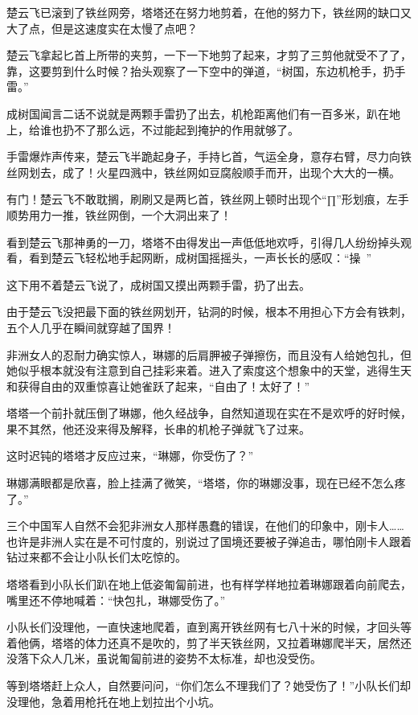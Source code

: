 楚云飞已滚到了铁丝网旁，塔塔还在努力地剪着，在他的努力下，铁丝网的缺口又大了点，但是这速度实在太慢了点吧？

楚云飞拿起匕首上所带的夹剪，一下一下地剪了起来，才剪了三剪他就受不了了，靠，这要剪到什么时候？抬头观察了一下空中的弹道，“树国，东边机枪手，扔手雷。”

成树国闻言二话不说就是两颗手雷扔了出去，机枪距离他们有一百多米，趴在地上，给谁也扔不了那么远，不过能起到掩护的作用就够了。

手雷爆炸声传来，楚云飞半跪起身子，手持匕首，气运全身，意存右臂，尽力向铁丝网划去，成了！火星四溅中，铁丝网如豆腐般顺手而开，出现个大大的一横。

有门！楚云飞不敢耽搁，刷刷又是两匕首，铁丝网上顿时出现个“∏”形划痕，左手顺势用力一推，铁丝网倒，一个大洞出来了！

看到楚云飞那神勇的一刀，塔塔不由得发出一声低低地欢呼，引得几人纷纷掉头观看，看到楚云飞轻松地手起网断，成树国摇摇头，一声长长的感叹：“操~”

这下用不着楚云飞说了，成树国又摸出两颗手雷，扔了出去。

由于楚云飞没把最下面的铁丝网划开，钻洞的时候，根本不用担心下方会有铁刺，五个人几乎在瞬间就穿越了国界！

非洲女人的忍耐力确实惊人，琳娜的后肩胛被子弹擦伤，而且没有人给她包扎，但她似乎根本就没有注意到自己挂彩来着。进入了索度这个想象中的天堂，逃得生天和获得自由的双重惊喜让她雀跃了起来，“自由了！太好了！”

塔塔一个前扑就压倒了琳娜，他久经战争，自然知道现在实在不是欢呼的好时候，果不其然，他还没来得及解释，长串的机枪子弹就飞了过来。

这时迟钝的塔塔才反应过来，“琳娜，你受伤了？”

琳娜满眼都是欣喜，脸上挂满了微笑，“塔塔，你的琳娜没事，现在已经不怎么疼了。”

三个中国军人自然不会犯非洲女人那样愚蠢的错误，在他们的印象中，刚卡人……也许是非洲人实在是不可忖度的，别说过了国境还要被子弹追击，哪怕刚卡人跟着钻过来都不会让小队长们太吃惊的。

塔塔看到小队长们趴在地上低姿匍匐前进，也有样学样地拉着琳娜跟着向前爬去，嘴里还不停地喊着：“快包扎，琳娜受伤了。”

小队长们没理他，一直快速地爬着，直到离开铁丝网有七八十米的时候，才回头等着他俩，塔塔的体力还真不是吹的，剪了半天铁丝网，又拉着琳娜爬半天，居然还没落下众人几米，虽说匍匐前进的姿势不太标准，却也没受伤。

等到塔塔赶上众人，自然要问问，“你们怎么不理我们了？她受伤了！”小队长们却没理他，急着用枪托在地上划拉出个小坑。

